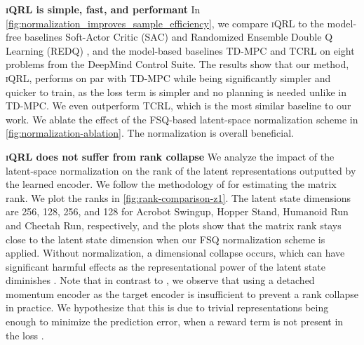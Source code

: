 \documentclass{article}
\theoremstyle{plain}
\theoremstyle{definition}
\theoremstyle{remark}
\newcommand{\our}{\textsc{iQRL}\xspace}
\begin{document}
\textbf{\our is simple, fast, and performant}
In \cref{fig:normalization_improves_sample_efficiency}, we compare \our to the model-free baselines Soft-Actor Critic (SAC) \cite{haarnojaSoft2018} and Randomized Ensemble Double Q Learning (REDQ) \cite{chenRandomizedEnsembledDouble2021}, and the model-based baselines TD-MPC \cite{hansenTemporalDifferenceLearning2022} and TCRL \cite{zhaoSimplifiedTemporalConsistency2023} on eight problems from the DeepMind Control Suite. The results show that our method, \our, performs on par with TD-MPC while being significantly simpler and quicker to train, as the loss term is simpler and no planning is needed unlike in TD-MPC. We even outperform TCRL, which is the most similar baseline to our work. We ablate the effect of the FSQ-based latent-space normalization scheme in \cref{fig:normalization-ablation}. The normalization is overall beneficial.

\textbf{\our does not suffer from rank collapse} We analyze the impact of the latent-space normalization on the rank of the latent representations outputted by the learned encoder. We follow the methodology of \citet{ni2024bridging} for estimating the matrix rank. We plot the ranks in \cref{fig:rank-comparison-z1}. The latent state dimensions are 256, 128, 256, and 128 for Acrobot Swingup, Hopper Stand, Humanoid Run and Cheetah Run, respectively, and the plots show that the matrix rank stays close to the latent state dimension when our FSQ normalization scheme is applied. Without normalization, a dimensional collapse occurs, which can have significant harmful effects as the representational power of the latent state diminishes \cite{jingUnderstandingDimensionalCollapse2021}. Note that in contrast to \citet{ni2024bridging}, we observe that using a detached momentum encoder as the target encoder is insufficient to prevent a rank collapse in practice. We hypothesize that this is due to trivial representations being enough to minimize the prediction error, when a reward term is not present in the loss \cite{tang2023understanding}. 
\end{document}
